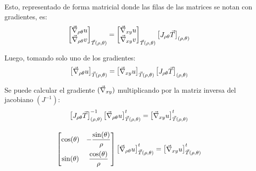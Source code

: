 \documentclass[a5paper,12pt,twoside]{book}
\begin{document}
Esto, representado de forma matricial donde las filas de las matrices se notan con gradientes, es:
\begin{equation*}
    \begin{bmatrix}
        \Vec{\nabla}_{\rho\theta} u
        \\
        \Vec{\nabla}_{\rho\theta} v
    \end{bmatrix}_{\Vec{T}(\rho,\theta)}
    =
    \begin{bmatrix}
        \Vec{\nabla}_{xy} u
        \\
        \Vec{\nabla}_{xy} v
    \end{bmatrix}_{\Vec{T}(\rho,\theta)}
    \begin{bmatrix}
        J_{\rho\theta} \Vec{T}
    \end{bmatrix}_{(\rho,\theta)}
\end{equation*}

Luego, tomando solo uno de los gradientes:
\begin{equation*}
    \begin{bmatrix}
        \Vec{\nabla}_{\rho\theta} u
    \end{bmatrix}_{\Vec{T}(\rho,\theta)}
    =
    \begin{bmatrix}
        \Vec{\nabla}_{xy} u
    \end{bmatrix}_{\Vec{T}(\rho,\theta)}
    \begin{bmatrix}
        J_{\rho\theta} \Vec{T}
    \end{bmatrix}_{(\rho,\theta)}
\end{equation*}

Se puede calcular el gradiente $(\Vec{\nabla}_{xy})$ multiplicando por la matriz inversa del jacobiano $(J^{-1})$:
\begin{gather*}
    \begin{bmatrix}
        J_{\rho\theta} \Vec{T}
    \end{bmatrix}_{(\rho,\theta)}^{-1}
    \begin{bmatrix}
        \Vec{\nabla}_{\rho\theta} u
    \end{bmatrix}_{\Vec{T}(\rho,\theta)}^t
    =
    \begin{bmatrix}
        \Vec{\nabla}_{xy} u
    \end{bmatrix}_{\Vec{T}(\rho,\theta)}^t
    \\[1em]
    \begin{bmatrix}
        \cos(\theta) & -\dfrac{\sin(\theta)}{\rho}
        \\[1em]
        \sin(\theta) & \dfrac{\cos(\theta)}{\rho}
    \end{bmatrix}
    \begin{bmatrix}
        \Vec{\nabla}_{\rho\theta} u
    \end{bmatrix}_{\Vec{T}(\rho,\theta)}^t
    =
    \begin{bmatrix}
        \Vec{\nabla}_{xy} u
    \end{bmatrix}_{\Vec{T}(\rho,\theta)}^t
\end{gather*}
\end{document}

